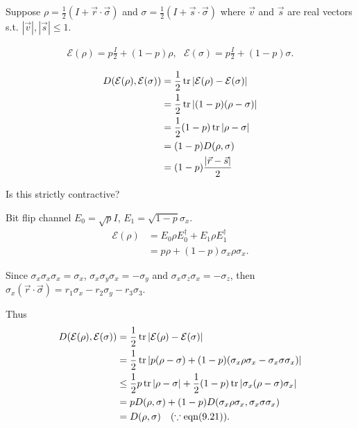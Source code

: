 Suppose $\rho = \frac{1}{2} (I + \vec{r}\cdot \vec{\sigma})$ and $\sigma = \frac{1}{2} (I + \vec{s}\cdot \vec{\sigma})$ where $\vec{v}$ and $\vec{s}$ are real vectors s.t. $|\vec{v}|, |\vec{s}| \leq 1$.

\begin{align*}
	\mathcal{E} (\rho) = p \frac{I}{2} + (1-p) \rho, ~~~
	\mathcal{E}(\sigma) = p \frac{I}{2} + (1-p) \sigma.
\end{align*}

\begin{align*}
	D(\mathcal{E}(\rho), \mathcal{E}(\sigma)) &= \frac{1}{2} \operatorname{tr} |\mathcal{E}(\rho) -  \mathcal{E}(\sigma)|\\
		&= \frac{1}{2} \operatorname{tr} |(1-p)(\rho - \sigma)|\\
		&= \frac{1}{2}(1-p) \operatorname{tr} |\rho - \sigma|\\
		&= (1-p) D(\rho, \sigma)\\
		&= (1-p) \frac{|\vec{r} - \vec{s}|}{2}
\end{align*}

Is this strictly contractive?


Bit flip channel $E_0 = \sqrt{p} I$,  $E_1 = \sqrt{1-p}\sigma_x$.
\begin{align*}
	\mathcal{E}(\rho) &= E_0 \rho E_0^\dagger + E_1 \rho E_1^\dagger\\
		&= p \rho + (1-p) \sigma_x \rho \sigma_x.
\end{align*}

Since $\sigma_x \sigma_x \sigma_x = \sigma_x$, $\sigma_x \sigma_y \sigma_x = -\sigma_y$ and $\sigma_x \sigma_z \sigma_x = -\sigma_z$, then $\sigma_x (\vec{r} \cdot \vec{\sigma}) = r_1 \sigma_x - r_2 \sigma_y - r_3 \sigma_3$.

Thus
\begin{align*}
	D(\mathcal{E}(\rho), \mathcal{E}(\sigma)) &= \frac{1}{2} \operatorname{tr} |\mathcal{E}(\rho) -  \mathcal{E}(\sigma)|\\
		&= \frac{1}{2} \operatorname{tr} |p(\rho - \sigma) + (1-p) (\sigma_x \rho \sigma_x - \sigma_x \sigma \sigma_x) |\\
		&\leq \frac{1}{2}p \operatorname{tr} |\rho - \sigma | + \frac{1}{2} (1-p) \operatorname{tr} |\sigma_x (\rho - \sigma) \sigma_x|\\
		&= pD(\rho, \sigma) +  (1-p) D(\sigma_x \rho \sigma_x, \sigma_x \sigma \sigma_x)\\
		&= D(\rho, \sigma)~~~(\because \text{eqn}(9.21)).
\end{align*}


